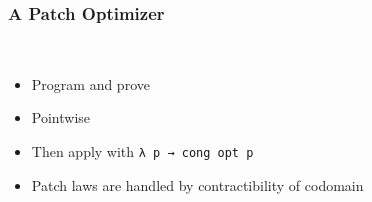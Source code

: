 \begin{frame}[fragile]
\frametitle{A Patch Optimizer}
\begin{code}[hide]%
\>[0]\<%
\\
\>[0][@{}l@{\AgdaIndent{0}}]%
\>[2]\AgdaSpace{}%
\AgdaSymbol{:}\<%
\end{code}
\begin{itemize}
\item Program and prove
\begin{code}%
\>[2][@{}l@{\AgdaIndent{1}}]%
\>[4]\AgdaSymbol{(}\AgdaSpace{}%
\AgdaSymbol{:}\AgdaSpace{}%
\AgdaSpace{}%
\AgdaSpace{}%
\AgdaSymbol{)}\AgdaSpace{}%
\AgdaSpace{}%
\AgdaFunction{Σ[}\AgdaSpace{}%
\AgdaSpace{}%
\AgdaSpace{}%
\AgdaSpace{}%
\AgdaSpace{}%
\AgdaSpace{}%
\AgdaFunction{]}\AgdaSpace{}%
\AgdaSpace{}%
\AgdaSpace{}%
\<%
\end{code}
\item Pointwise
\begin{code}%
%
\>[2]\AgdaSpace{}%
\AgdaSymbol{:}\AgdaSpace{}%
\AgdaSymbol{(}\AgdaSpace{}%
\AgdaSymbol{:}\AgdaSpace{}%
\AgdaSymbol{)}\AgdaSpace{}%
\AgdaSpace{}%
\AgdaFunction{Σ[}\AgdaSpace{}%
\AgdaSpace{}%
\AgdaSpace{}%
\AgdaSpace{}%
\AgdaFunction{]}\AgdaSpace{}%
\AgdaSpace{}%
\AgdaSpace{}%
\<%
\end{code}
\item Then apply with \texttt{λ p → cong opt p}
\item Patch laws are handled by contractibility of codomain
\end{itemize}
\end{frame}
